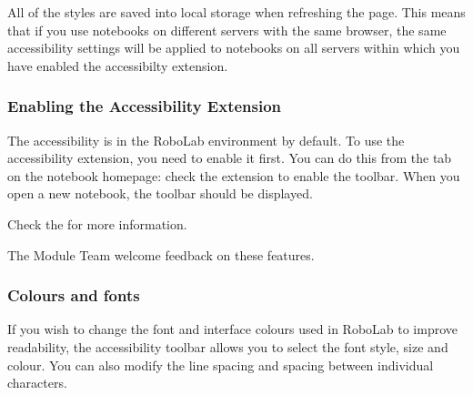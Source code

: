 \documentclass[letterpaper,10pt,english]{sphinxmanual}
\let\sphinxpxdimen\pdfpxdimen\else\newdimen\sphinxpxdimen
\begin{document}

All of the styles are saved into local storage when refreshing the page. This means that if you use notebooks on different servers with the same browser, the same accessibility settings will be applied to notebooks on all servers within which you have enabled the accessibilty extension.


\subsubsection{Enabling the Accessibility Extension}
\label{\detokenize{content/00_READ_ME_FIRST/Section_00_03_Accessibility:Enabling-the-Accessibility-Extension}}
The accessibility is  in the RoboLab environment by default. To use the accessibility extension, you need to enable it first. You can do this from the  tab on the notebook homepage: check the  extension to enable the toolbar. When you open a new notebook, the toolbar should be displayed.

\noindent\sphinxincludegraphics[width=2344\sphinxpxdimen,height=1326\sphinxpxdimen]{{00_01_nb_extensions_accessibility}.png}

Check the  for more information.

The Module Team welcome feedback on these features.


\subsubsection{Colours and fonts}
\label{\detokenize{content/00_READ_ME_FIRST/Section_00_03_Accessibility:Colours-and-fonts}}
If you wish to change the font and interface colours used in RoboLab to improve readability, the accessibility toolbar allows you to select the font style, size and colour. You can also modify the line spacing and spacing between individual characters.
\end{document}
